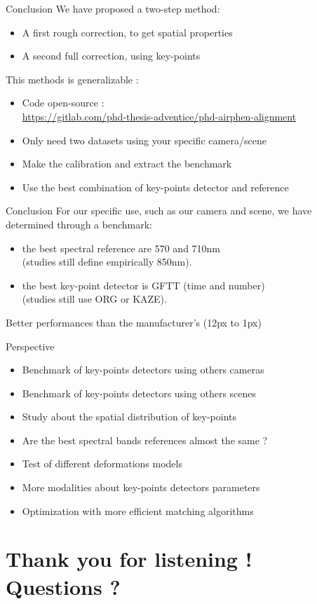 \documentclass{beamer}
\begin{document}
		\begin{frame}{Conclusion}
			We have proposed a two-step method:
			\begin{itemize}
				\item A first rough correction, to get spatial properties
				\item A second full correction, using key-points
			\end{itemize}
		
			This methods is generalizable :
			\begin{itemize}
				\item Code open-source : \\ {\tiny \url{https://gitlab.com/phd-thesis-adventice/phd-airphen-alignment} }
				\item Only need two datasets using your specific camera/scene
				\item Make the calibration and extract the benchmark
				\item Use the best combination of key-points detector and reference
			\end{itemize}
		\end{frame}
	
		\begin{frame}{Conclusion}
			For our specific use, such as our camera and scene, we have determined through a benchmark:
			
			\begin{itemize}
				\item the best spectral reference are 570 and 710nm \\ (studies still define empirically 850nm).
				\item the best key-point detector is GFTT (time and number) \\ (studies still use ORG or KAZE).
			\end{itemize}
			
			Better performances than the manufacturer's (12px to 1px)
		\end{frame}
		\begin{frame}{Perspective}
			\begin{itemize}
				\item Benchmark of key-points detectors using others cameras
				\item Benchmark of key-points detectors using others scenes
				\item Study about the spatial distribution of key-points
				\item Are the best spectral bands references almost the same ?
				\item Test of different deformations models
				\item More modalities about key-points detectors parameters
				\item Optimization with more efficient matching algorithms
			\end{itemize}
		\end{frame}
	\section{Thank you for listening ! \\ Questions ?}
			
\end{document}

